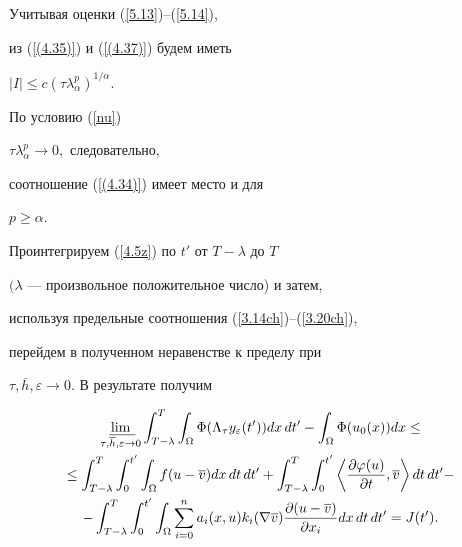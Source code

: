 Учитывая оценки  (\ref{5.13})--(\ref{5.14}),


из (\ref{(4.35)}) и (\ref{(4.37)}) будем иметь


$ |I|\le c(\tau\lambda^{p}_{\alpha})^{1/\alpha}$.


По условию (\ref{nu})


$\tau\lambda ^{p}_{\alpha } \to 0,$ следовательно,


соотношение (\ref{(4.34)}) имеет место и для


$p \ge  \alpha .$





Проинтегрируем (\ref{4.5z}) по $t'$ от $T-\lambda$ до $T$


$(\lambda$ --- произвольное положительное число) и затем,


используя предельные соотношения (\ref{3.14ch})--(\ref{3.20ch}),


перейдем в полученном неравенстве к пределу при


$\tau, \overline{h}, \varepsilon \to 0$. В результате получим


\begin{gather}


\lim_{\tau,\overline{\overline h, \varepsilon \to} 0}


\int^{T}_{T-\lambda} \int_{\Omega}


\Phi (\Lambda_\tau y_\varepsilon (t')) dx\, dt' -


\int_{\Omega} \Phi (u_0(x))dx \le\notag\\


%


\le \int^{T}_{T-\lambda} \int^{t'}_{0} \int_{\Omega}


f(u - \overline{v} ) dx \,dt\, dt' +


\int^{T}_{T-\lambda} \int^{t'}_{0}


\left\langle \frac{\partial \varphi (u)}{\partial t} , \overline{v}


\right\rangle dt \,dt' -


\notag\\


%


- \int^{T}_{T-\lambda} \int^{t'}_{0} \int_{\Omega}


\sum^{n}_{i=0} a_i(x,u) k_i(\nabla \overline{v})


\frac{\partial (u - \overline{v})}{\partial x_i} dx\, dt\, dt' =


J(t'). \label{4.6}


\end{gather}


